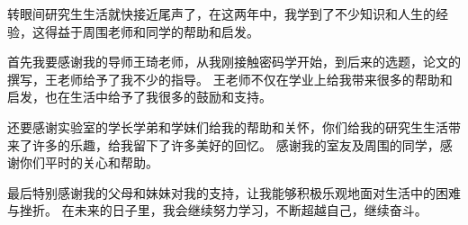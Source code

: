 \begin{acknowledgements}

转眼间研究生生活就快接近尾声了，在这两年中，我学到了不少知识和人生的经验，这得益于周围老师和同学的帮助和启发。

首先我要感谢我的导师王琦老师，从我刚接触密码学开始，到后来的选题，论文的撰写，王老师给予了我不少的指导。
王老师不仅在学业上给我带来很多的帮助和启发，也在生活中给予了我很多的鼓励和支持。

还要感谢实验室的学长学弟和学妹们给我的帮助和关怀，你们给我的研究生生活带来了许多的乐趣，给我留下了许多美好的回忆。
感谢我的室友及周围的同学，感谢你们平时的关心和帮助。

最后特别感谢我的父母和妹妹对我的支持，让我能够积极乐观地面对生活中的困难与挫折。
在未来的日子里，我会继续努力学习，不断超越自己，继续奋斗。

\end{acknowledgements}
